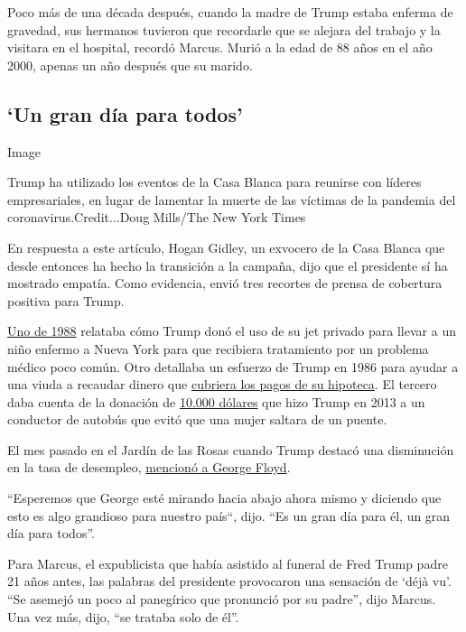Poco más de una década después, cuando la madre de Trump estaba enferma
de gravedad, sus hermanos tuvieron que recordarle que se alejara del
trabajo y la visitara en el hospital, recordó Marcus. Murió a la edad de
88 años en el año 2000, apenas un año después que su marido.

\hypertarget{un-gran-duxeda-para-todos}{%
\subsection{`Un gran día para todos'}\label{un-gran-duxeda-para-todos}}

Image

Trump ha utilizado los eventos de la Casa Blanca para reunirse con
líderes empresariales, en lugar de lamentar la muerte de las víctimas de
la pandemia del coronavirus.Credit...Doug Mills/The New York Times

En respuesta a este artículo, Hogan Gidley, un exvocero de la Casa
Blanca que desde entonces ha hecho la transición a la campaña, dijo que
el presidente sí ha mostrado empatía. Como evidencia, envió tres
recortes de prensa de cobertura positiva para Trump.

\href{https://www.jta.org/1988/07/20/archive/orthodox-child-with-rare-ailment-is-rescued-aboard-tycoons-jet}{Uno
de 1988} relataba cómo Trump donó el uso de su jet privado para llevar a
un niño enfermo a Nueva York para que recibiera tratamiento por un
problema médico poco común. Otro detallaba un esfuerzo de Trump en 1986
para ayudar a una viuda a recaudar dinero que
\href{https://apnews.com/24c831825e0dab47d51d8d25bffe45f5}{cubriera los
pagos de su hipoteca}. El tercero daba cuenta de la donación de
\href{https://www.aol.com/2013/11/08/trump-gift-barton-buffalo/}{10.000
dólares} que hizo Trump en 2013 a un conductor de autobús que evitó que
una mujer saltara de un puente.

El mes pasado en el Jardín de las Rosas cuando Trump destacó una
disminución en la tasa de desempleo,
\href{https://www.nytimes3xbfgragh.onion/2020/06/05/us/politics/trump-jobs-report-george-floyd.html}{mencionó
a George Floyd}.

``Esperemos que George esté mirando hacia abajo ahora mismo y diciendo
que esto es algo grandioso para nuestro país``, dijo. ``Es un gran día
para él, un gran día para todos''.

Para Marcus, el expublicista que había asistido al funeral de Fred Trump
padre 21 años antes, las palabras del presidente provocaron una
sensación de `déjà vu'. ``Se asemejó un poco al panegírico que pronunció
por su padre'', dijo Marcus. Una vez más, dijo, ``se trataba solo de
él''.

